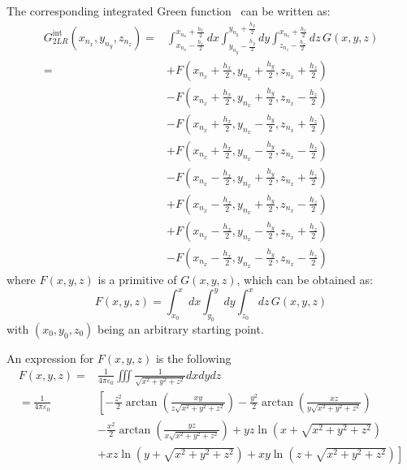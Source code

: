 The corresponding integrated Green function~\cite{QIANG2004278} can be written as:
\begin{align}
G_{2LR}^\text{int}(x_{n_x}, y_{n_y}, z_{n_z}) =& 
\int_{x_{n_x}-\frac{h_x}{2}}^{x_{n_x}+\frac{h_x}{2}} dx
\int_{y_{n_y}-\frac{h_y}{2}}^{y_{n_y}+\frac{h_y}{2}} dy
\int_{z_{n_z}-\frac{h_z}{2}}^{x_{n_z}+\frac{h_z}{2}} dz\,
G(x,y,z)\\
= &+F\left(x_{n_x}+\frac{h_x}{2}, y_{n_x}+\frac{h_y}{2}, z_{n_x}+\frac{h_z}{2}\right) \\
    &- F\left(x_{n_x}+\frac{h_x}{2}, y_{n_x}+\frac{h_y}{2}, z_{n_x}-\frac{h_z}{2}\right)\\
    &- F\left(x_{n_x}+\frac{h_x}{2}, y_{n_x}-\frac{h_y}{2}, z_{n_x}+\frac{h_z}{2}\right)\\ 
    &+ F\left(x_{n_x}+\frac{h_x}{2}, y_{n_x}-\frac{h_y}{2}, z_{n_x}-\frac{h_z}{2}\right)\\
    &-F\left(x_{n_x}-\frac{h_x}{2}, y_{n_x}+\frac{h_y}{2}, z_{n_x}+\frac{h_z}{2}\right) \\
    &+ F\left(x_{n_x}-\frac{h_x}{2}, y_{n_x}+\frac{h_y}{2}, z_{n_x}-\frac{h_z}{2}\right)\\
    &+ F\left(x_{n_x}-\frac{h_x}{2}, y_{n_x}-\frac{h_y}{2}, z_{n_x}+\frac{h_z}{2}\right)\\ 
    & - F\left(x_{n_x}-\frac{h_x}{2}, y_{n_x}-\frac{h_y}{2}, z_{n_x}-\frac{h_z}{2}\right)
\end{align}
where $F(x,y,z)$ is a primitive of $G(x,y,z)$, which can be obtained as:
\begin{equation}
F(x,y,z) = 
\int_{x_0}^{x} dx
\int_{y_0}^{y} dy
\int_{z_0}^{x} dz\,
G(x,y,z)
\end{equation}
with $(x_0, y_0, z_0)$ being an arbitrary starting point.

An expression for $F(x,y,z)$ is the following
\begin{align}
F(x,y,z) =&\frac{1}{4\pi\varepsilon_0}\iiint \frac{1}{\sqrt{x^{2}+y^{2}+z^{2}}} d x d y d z\\ 
= \frac{1}{4\pi \varepsilon_0}&\left[-\frac{z^{2}}{2} \arctan \left(\frac{x y}{z \sqrt{x^{2}+y^{2}+z^{2}}}\right)\right.
-\frac{y^{2}}{2} \arctan \left(\frac{x z}{y \sqrt{x^{2}+y^{2}+z^{2}}}\right)\\
&-\frac{x^{2}}{2} \arctan \left(\frac{y z}{x \sqrt{x^{2}+y^{2}+z^{2}}}\right) 
+y z \ln \left(x+\sqrt{x^{2}+y^{2}+z^{2}}\right)\\
&\left. +x z \ln \left(y+\sqrt{x^{2}+y^{2}+z^{2}}\right)
+x y \ln \left(z+\sqrt{x^{2}+y^{2}+z^{2}}\right)\right]
\end{align}

